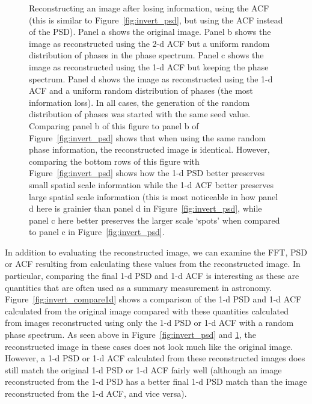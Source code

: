 \documentclass[11pt,preprint]{aastex}
\begin{document}
\begin{figure}[htpb]
\caption{{\small
Reconstructing an image after losing information, using the ACF (this is similar to Figure~\ref{fig:invert_psd}, but using the ACF instead of the PSD).  
Panel a shows the original image. Panel b shows the image as reconstructed using the 2-d ACF but a uniform random distribution of phases in the phase spectrum. Panel c shows the image as reconstructed using the 1-d ACF but keeping the phase spectrum. Panel d shows the image as reconstructed using the 1-d ACF and a uniform random distribution of phases (the most information loss).  In all cases, the generation of the random distribution of phases was started with the same seed value. Comparing panel b of this figure to panel b of Figure~\ref{fig:invert_psd} shows that when using the same random phase information, the reconstructed image is identical. However, comparing the bottom rows of this figure with Figure~\ref{fig:invert_psd} shows how the 1-d PSD better preserves small spatial scale information while the 1-d ACF better preserves large spatial scale information (this is most noticeable in how panel d here is grainier than panel d in Figure~\ref{fig:invert_psd}, while panel c here better preserves the larger scale `spots' when compared to panel c in Figure~\ref{fig:invert_psd}.}}
\label{fig:invert_acf}
\end{figure}

In addition to evaluating the reconstructed image, we can examine the FFT, PSD or ACF resulting from calculating these values from the reconstructed image. In particular, comparing the final 1-d PSD and 1-d ACF is interesting as these are quantities that are often used as a summary measurement in astronomy. Figure~\ref{fig:invert_compare1d} shows a comparison of the 1-d PSD and 1-d ACF calculated from the original image compared with these quantities calculated from images reconstructed using only the 1-d PSD or 1-d ACF with a random phase spectrum. As seen above in Figure~\ref{fig:invert_psd} and \ref{fig:invert_acf}, the reconstructed image in these cases does not look much like the original image. However, a 1-d PSD or 1-d ACF calculated from these reconstructed images does still match the original 1-d PSD or 1-d ACF fairly well (although an image reconstructed from the 1-d PSD has a better final 1-d PSD match than the image reconstructed from the 1-d ACF, and vice versa). 
\end{document}
